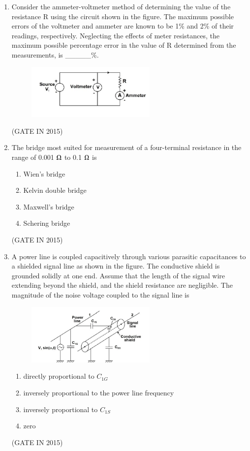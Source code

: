 \documentclass[journal]{IEEEtran}
\begin{document}
\begin{enumerate}
\item Consider the ammeter-voltmeter method of determining the value of the resistance R using the circuit shown in the figure. The maximum possible errors of the voltmeter and ammeter are known to be 1\% and 2\% of their readings, respectively. Neglecting the effects of meter resistances, the maximum possible percentage error in the value of R determined from the measurements, is \_\_\_\_\_\%.
\begin{figure}[H]
    \centering
      \includegraphics[width=0.6\textwidth]{9.png} 
      \caption{}
    \label{fig:fig9} 
\end{figure}
   \hfill(GATE IN 2015)

\item The bridge most suited for measurement of a four-terminal resistance in the range of 0.001 $\ohm$ to 0.1 $\ohm$ is

\begin{multicols}{2}
\begin{enumerate}
\item Wien's bridge
\item Kelvin double bridge
\item Maxwell's bridge
\item Schering bridge
\end{enumerate}
  \end{multicols} \hfill(GATE IN 2015)

\item A power line is coupled capacitively through various parasitic capacitances to a shielded signal line as shown in the figure. The conductive shield is grounded solidly at one end. Assume that the length of the signal wire extending beyond the shield, and the shield resistance are negligible. The magnitude of the noise voltage coupled to the signal line is
\begin{figure}[H]
    \centering
      \includegraphics[width=0.6\textwidth]{10.png} 
      \caption{}
    \label{fig:fig10} 
\end{figure}
\begin{enumerate}
\item directly proportional to $C_{1G}$
\item inversely proportional to the power line frequency
\item inversely proportional to $C_{1S}$
\item zero
\end{enumerate}
 \hfill(GATE IN 2015)


\end{enumerate}
\end{document}
